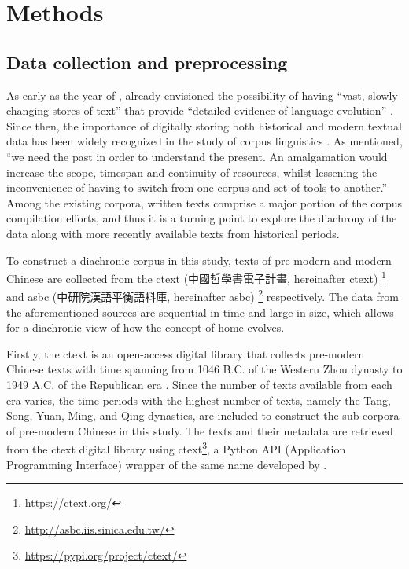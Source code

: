 

\chapter{Methods}
\label{methods}

\section{Data collection and preprocessing}
As early as the year of \cite*{sinclair1982reflections}, \citeauthor{sinclair1982reflections} already envisioned the possibility of having ``vast, slowly changing stores of text'' that provide ``detailed evidence of language evolution'' . Since then, the importance of digitally storing both historical and modern textual data has been widely recognized in the study of corpus linguistics \parencite{renouf2002time}. As \textcite{renouf2002time} mentioned, ``we need the past in order to understand the present. An amalgamation would increase the scope, timespan and continuity of resources, whilst lessening the inconvenience of having to switch from one corpus and set of tools to another.''  Among the existing corpora, written texts comprise a major portion of the corpus compilation efforts, and thus it is a turning point to explore the diachrony of the data along with more recently available texts from historical periods.

To construct a diachronic corpus in this study, texts of pre-modern and modern Chinese are collected from the \acrlong{ctext} (中國哲學書電子計畫, hereinafter \acrshort{ctext}) \parencite{sturgeon2019ctext}\footnote{\url{https://ctext.org/}} and \acrlong{asbc} (中研院漢語平衡語料庫, hereinafter \acrshort{asbc}) \parencite{chen1996sinica}\footnote{\url{http://asbc.iis.sinica.edu.tw/}} respectively. The data from the aforementioned sources are sequential in time and large in size, which allows for a diachronic view of how the concept of home evolves.

Firstly, the \acrlong{ctext} is an open-access digital library that collects pre-modern Chinese texts with time spanning from 1046 B.C. of the Western Zhou dynasty to 1949 A.C. of the Republican era \parencite{sturgeon2019ctext}. Since the number of texts available from each era varies, the time periods with the highest number of texts, namely the Tang, Song, Yuan, Ming, and Qing dynasties, are included to construct the sub-corpora of pre-modern Chinese in this study. The texts and their metadata are retrieved from the \gls{ctext} digital library using ctext\footnote{\url{https://pypi.org/project/ctext/}}, a Python API (Application Programming Interface) wrapper of the same name developed by \textcite{ctextapi}.

